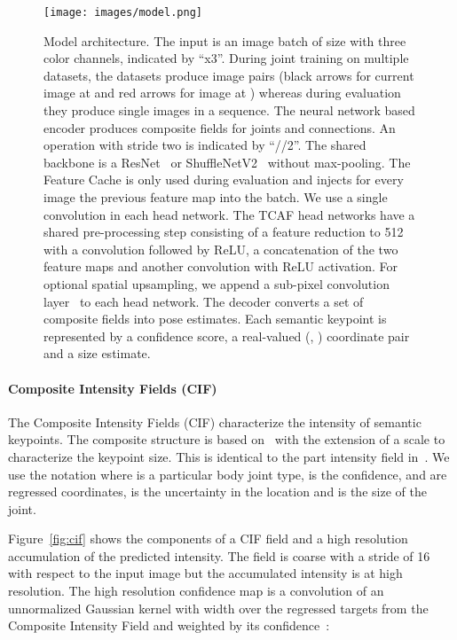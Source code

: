 \documentclass[journal]{IEEEtran}
\begin{document}
\begin{figure*}[t]
  \centering
  \texttt{[image: images/model.png]}
  \caption[Model architecture]{
    Model architecture. The input is an image batch of size  with three color
    channels, indicated by ``x3''.
    During joint training on multiple datasets, the datasets produce image pairs (black arrows for current image at  and red arrows for image at ) whereas during evaluation they produce single images in a sequence.
    The neural network based encoder produces composite fields
    for  joints and  connections.
    An operation with stride two is indicated by ``//2''.
    The shared backbone is a ResNet~\cite{he2016deep}
    or ShuffleNetV2~\cite{ma2018shufflenet} without max-pooling.
    The Feature Cache is only used during evaluation and injects for every image the previous
    feature map into the batch.
    We use a single  convolution in each head network.
    The TCAF head networks have a shared pre-processing step
    consisting of a feature reduction to 512 with a 
    convolution followed by ReLU, a concatenation of the two feature maps
    and another  convolution with ReLU activation.
    For optional spatial upsampling, we append a sub-pixel convolution
    layer~\cite{shi2016real} to each head network.
    The decoder converts a set of composite fields into pose
    estimates. Each semantic keypoint is represented by a confidence score,
    a real-valued (, ) coordinate pair and a size estimate.
  }
  \label{fig:model}
\end{figure*}


\paragraph{Composite Intensity Fields (CIF)}

The Composite Intensity Fields (CIF) characterize the intensity of semantic
keypoints. The composite structure is based on~\cite{papandreou2017towards}
with the extension of a scale  to characterize the keypoint
size. This is identical to the part intensity field in~\cite{kreiss2019pifpaf}.
We use the notation
 where  is a particular
body joint type,  is the confidence,  and  are regressed coordinates,
 is the uncertainty in the location and  is the size of the joint.

Figure~\ref{fig:cif} shows the components of a CIF field and a high resolution
accumulation of the predicted intensity. The field is coarse with a stride of
16 with respect to the input image but the accumulated intensity is at high
resolution.
The high resolution confidence map  is a convolution
of an unnormalized Gaussian kernel  with width  over
the regressed targets from
the Composite Intensity Field  and  weighted by its confidence~:
\end{document}
